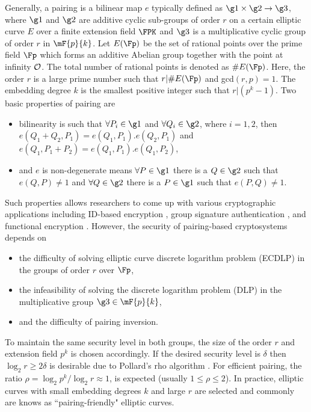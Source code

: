 Generally, a pairing is a bilinear map $e$ typically defined as  $\g1 \times \g2 \to \g3$, where $\g1$ and $\g2$ are additive cyclic sub-groups of  order $r$  on a certain elliptic curve $E$ over a finite extension field $\FPK$ and $\g3$ is a multiplicative cyclic group of order $r$ in $\mF{p}{k}$.
Let $E(\Fp)$ be the set of rational points over the prime field $\Fp$ which forms an additive Abelian group together with the point at infinity $\cal{O}$. The total number of rational points is denoted as $\#E(\Fp)$. Here, the order $r$ is a large prime number such that $r | \#E(\Fp)$ and gcd$(r,p)=1$. The embedding degree $k$ is the smallest positive integer such that $r | (p^k -1)$.
Two basic properties of pairing are
\begin{itemize}
	\item bilinearity is such that $\forall P_i \in \g1$ and $\forall Q_i \in \g2$, where $i= 1, 2$, then $e(Q_1+Q_2,P_1) = e(Q_1,P_1). e(Q_2,P_1)$ and $e(Q_1,P_1+P_2) = e(Q_1,P_1). e(Q_1,P_2)$,
	\item and $e$ is non-degenerate means $\forall P \in \g1$ there is a $Q \in \g2$ such that  $e(Q,P) \neq 1$ and $\forall Q \in \g2$ there is a $P \in \g1$ such that $e(P,Q) \neq 1$.
\end{itemize}
Such properties allows researchers to come up with various cryptographic applications including ID-based encryption \cite{C:BonFra01}, group signature authentication \cite{C:BonBoySha04}, and functional encryption \cite{C:OkaTak10}.  However, the security of pairing-based cryptosystems depends  on 
\begin{itemize}
	\item  the difficulty of solving elliptic curve discrete logarithm problem (ECDLP) in the groups of order $r$ over $\Fp$,
	\item  the infeasibility of solving the discrete logarithm problem (DLP) in the multiplicative group $\g3 \in \mF{p}{k}$,
	\item and the difficulty of pairing inversion.
\end{itemize}
To maintain the same security level in both groups, the size of the order $r$ and extension field $p^k$ is chosen accordingly. If the desired security level is $\delta$ then $\log_2 r  \geq 2\delta$ is desirable due to Pollard's rho algorithm \cite{TODO}.  For efficient pairing, the ratio $\rho = \log_2 p^k/ \log_2 r \approx 1$,   is expected (usually  $1\leq  \rho  \leq 2$). In practice, elliptic curves with small embedding degrees $k$ and large $r$ are selected and commonly are knows as ``pairing-friendly" elliptic curves.

